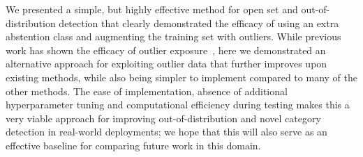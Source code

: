 \documentclass[accepted]{uai2021} \pdfoutput=1
\begin{document}
We presented a simple, but highly effective method for open set and out-of-distribution detection that clearly demonstrated the efficacy of using an extra abstention class and augmenting the training set with outliers. While previous work has shown the efficacy of outlier exposure~\cite{hendrycks2018deep}, here we demonstrated an alternative approach for exploiting outlier data that further improves upon existing methods, while also being simpler to implement compared to many of the other methods. The ease of implementation, absence of additional hyperparameter tuning and computational efficiency during testing makes this a very viable approach for improving out-of-distribution and novel category detection in real-world deployments; we hope that this will also serve as an effective baseline for comparing future work in this domain.









\end{document}
